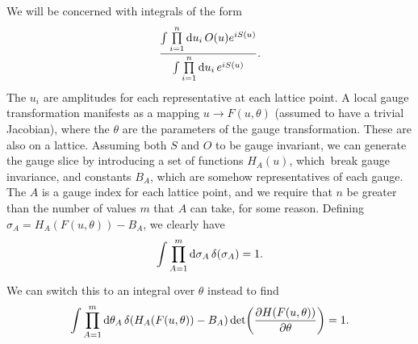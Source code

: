 We will be concerned with integrals of the form
\begin{align*}
	\frac{\int\limits_{}^{}\prod\limits_{i = 1}^{n}\dd{u_{i}}O(u)e^{iS(u)}}{\int\limits_{}^{}\prod\limits_{i = 1}^{n}\dd{u_{i}}e^{iS(u)}}.
\end{align*}
The $u_{i}$ are amplitudes for each representative at each lattice point. A local gauge transformation manifests as a mapping $u\to F(u, \theta)$ (assumed to have a trivial Jacobian), where the $\theta$ are the parameters of the gauge transformation. These are also on a lattice. Assuming both $S$ and $O$ to be gauge invariant, we can generate the gauge slice by introducing a set of functions $H_{A}(u)$, which break gauge invariance, and constants $B_{A}$, which are somehow representatives of each gauge. The $A$ is a gauge index for each lattice point, and we require that $n$ be greater than the number of values $m$ that $A$ can take, for some reason. Defining $\sigma_{A} = H_{A}(F(u, \theta)) - B_{A}$, we clearly have
\begin{align*}
	\int\limits_{}^{}\prod\limits_{A = 1}^{m}\dd{\sigma_{A}}\delta(\sigma_{A}) = 1.
\end{align*}
We can switch this to an integral over $\theta$ instead to find
\begin{align*}
	\int\limits_{}^{}\prod\limits_{A = 1}^{m}\dd{\theta_{A}}\delta(H_{A}(F(u, \theta)) - B_{A})\det(\pdv{H(F(u, \theta))}{\theta}) = 1.
\end{align*}

